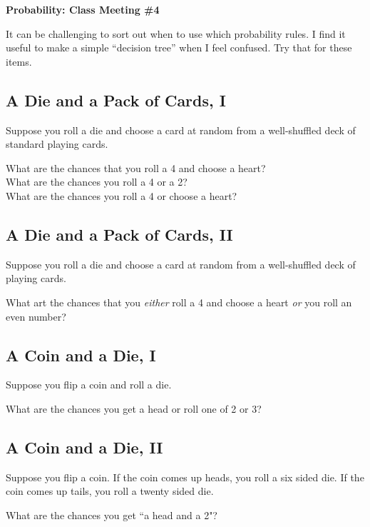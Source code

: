 \documentclass[12pt]{amsart}
\theoremstyle{definition}
\begin{document}
\begin{center}
\textbf{\Huge
Probability: Class Meeting \#4
}
\end{center}
\vspace{.5in}

It can be challenging to sort out when to use which probability rules. I find it useful to make a simple ``decision tree'' when I feel confused. Try that for these items.

\subsection*{A Die and a Pack of Cards, I}
Suppose you roll a die and choose a card at random from a well-shuffled deck of standard playing cards.

What are the chances that you roll a 4 and choose a heart?\\

What are the chances you roll a 4 or a 2?\\

What are the chances you roll a 4 or choose a heart?\\

\subsection*{A Die and a Pack of Cards, II} Suppose you roll a die and choose a card at random from a well-shuffled deck of playing cards.

What art the chances that you \emph{either} roll a 4 and choose a heart \emph{or} you roll an even number?\\

\subsection*{A Coin and a Die, I} Suppose you flip a coin and roll a die.

What are the chances you get a head or roll one of 2 or 3?\\

\subsection*{A Coin and a Die, II} Suppose you flip a coin. If the coin comes up heads, you roll a six sided die. If the coin comes up tails, you roll a twenty sided die.

What are the chances you get ``a head and a 2"?\\
\end{document}
